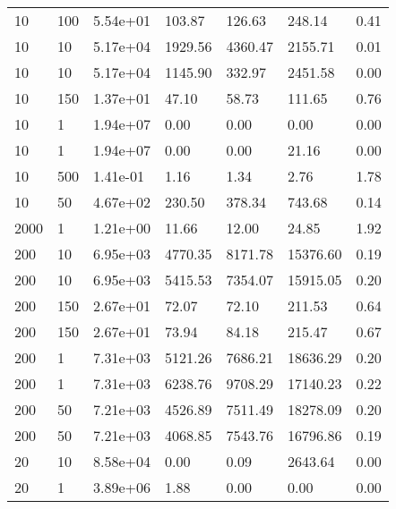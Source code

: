 \begin{table}
\begin{tabular}{lllllll}
10        &   100       &   5.54e+01  &   103.87    &   126.63    &   248.14    &   0.41      \\ 
10        &   10        &   5.17e+04  &   1929.56   &   4360.47   &   2155.71   &   0.01      \\ 
10        &   10        &   5.17e+04  &   1145.90   &   332.97    &   2451.58   &   0.00      \\ 
10        &   150       &   1.37e+01  &   47.10     &   58.73     &   111.65    &   0.76      \\ 
10        &   1         &   1.94e+07  &   0.00      &   0.00      &   0.00      &   0.00      \\ 
10        &   1         &   1.94e+07  &   0.00      &   0.00      &   21.16     &   0.00      \\ 
10        &   500       &   1.41e-01  &   1.16      &   1.34      &   2.76      &   1.78      \\ 
10        &   50        &   4.67e+02  &   230.50    &   378.34    &   743.68    &   0.14      \\ 
2000      &   1         &   1.21e+00  &   11.66     &   12.00     &   24.85     &   1.92      \\ 
200       &   10        &   6.95e+03  &   4770.35   &   8171.78   &   15376.60  &   0.19      \\ 
200       &   10        &   6.95e+03  &   5415.53   &   7354.07   &   15915.05  &   0.20      \\ 
200       &   150       &   2.67e+01  &   72.07     &   72.10     &   211.53    &   0.64      \\ 
200       &   150       &   2.67e+01  &   73.94     &   84.18     &   215.47    &   0.67      \\ 
200       &   1         &   7.31e+03  &   5121.26   &   7686.21   &   18636.29  &   0.20      \\ 
200       &   1         &   7.31e+03  &   6238.76   &   9708.29   &   17140.23  &   0.22      \\ 
200       &   50        &   7.21e+03  &   4526.89   &   7511.49   &   18278.09  &   0.20      \\ 
200       &   50        &   7.21e+03  &   4068.85   &   7543.76   &   16796.86  &   0.19      \\ 
20        &   10        &   8.58e+04  &   0.00      &   0.09      &   2643.64   &   0.00      \\ 
20        &   1         &   3.89e+06  &   1.88      &   0.00      &   0.00      &   0.00      \\ 

\end{tabular}
\end{table}
